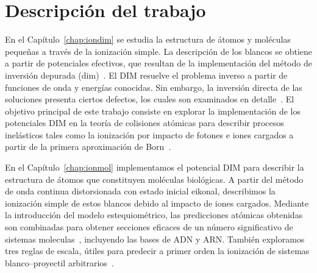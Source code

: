 

\section{Descripción del trabajo}

En el Capítulo~\ref{chap:iondim} se estudia la estructura de átomos y 
moléculas pequeñas a través de la ionización simple. La descripción de 
los blancos se obtiene a partir de potenciales efectivos, que resultan 
de la implementación del método de inversión depurada 
(\acs{dim})~\cite{Mendez:16,Mendez:19dim}. El DIM resuelve el problema 
inverso a partir de funciones de onda y energías conocidas. Sin embargo, 
la inversión directa de las soluciones presenta ciertos defectos, los 
cuales son examinados en detalle~\cite{Mendez:18,Mitnik:19}. El objetivo 
principal de este trabajo consiste en explorar la implementación de los
potenciales DIM en la teoría de colisiones atómicas para describir 
procesos inelásticos tales como la ionización por impacto de fotones e 
iones cargados a partir de la primera aproximación de 
Born~\cite{Mendez:19dim}. 

En el Capítulo~\ref{chap:ionmol} implementamos el potencial DIM para 
describir la estructura de átomos que constituyen moléculas biológicas.
A partir del método de onda continua distorsionada con estado inicial 
eikonal, describimos la ionización simple de estos blancos debido al 
impacto de iones cargados. Mediante la introducción del modelo  
estequiométrico, las predicciones atómicas obtenidas son combinadas para  
obtener secciones eficaces de un número significativo de sistemas 
moleculas~\cite{Mendez:20ionmol}, incluyendo las bases de ADN y 
ARN. También exploramos tres reglas de escala, útiles para predecir a 
primer orden la ionización de sistemas blanco--proyectil 
arbitrarios~\cite{Mendez:20scale}. 

